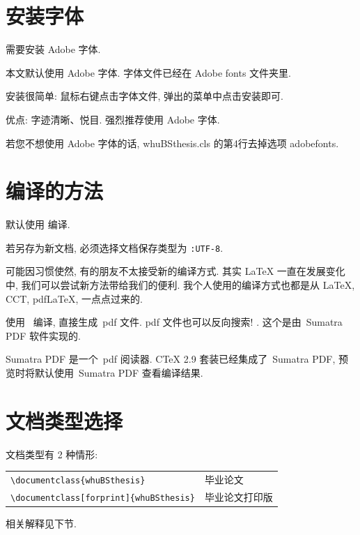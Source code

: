\documentclass{whuBSthesis}%
\begin{document}
\section{安装字体}\label{sec-Adobe}

需要安装 Adobe 字体.

{\kaishu 本文默认使用 Adobe 字体. 字体文件已经在 Adobe fonts 文件夹里.

安装很简单: 鼠标右键点击字体文件, 弹出的菜单中点击安装即可.

优点: 字迹清晰、悦目. 强烈推荐使用 Adobe 字体.

若您不想使用 Adobe 字体的话, whuBSthesis.cls 的第4行去掉选项 adobefonts. }


\section{编译的方法}\label{sec-compile}

默认使用 \XeLaTeX{} 编译.

若另存为新文档, 必须选择文档保存类型为 \verb|:UTF-8|.

{\kaishu 可能因习惯使然, 有的朋友不太接受新的编译方式.
其实 \LaTeX{} 一直在发展变化中, 我们可以尝试新方法带给我们的便利.
我个人使用的编译方式也都是从 \LaTeX{}, CCT,  pdf\LaTeX{}, \XeLaTeX{} 一点点过来的. }

使用~\XeLaTeX{} 编译, 直接生成~pdf 文件.
pdf 文件也可以反向搜索! {}.
这个是由~Sumatra PDF 软件实现的.

Sumatra PDF 是一个~pdf 阅读器. CTeX 2.9 套装已经集成了~Sumatra PDF, 预览时将默认使用~Sumatra PDF 查看编译结果.



\section{文档类型选择}
文档类型有 2 种情形:

\begin{table}[ht]\centering
\begin{tabular}{ll}
\hline
   \verb|\documentclass{whuBSthesis}|                   &  毕业论文 \\
   \verb|\documentclass[forprint]{whuBSthesis}|        &  毕业论文打印版 \\
\hline
\end{tabular}
\end{table}
相关解释见下节.
\end{document}
